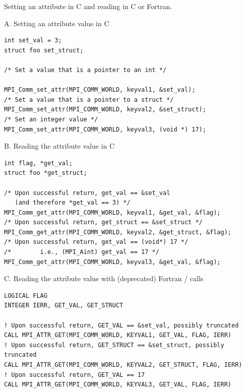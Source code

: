 \label{exa:misc-attr:c:pagebegin}%
\begin{example}
Setting an attribute in C and reading in C or Fortran.
%
%
\label{exa:misc-attr:c}%

A. Setting an attribute value in C
\begin{lstlisting}[language={[MPI]C}]
int set_val = 3;
struct foo set_struct;

/* Set a value that is a pointer to an int */

MPI_Comm_set_attr(MPI_COMM_WORLD, keyval1, &set_val);
/* Set a value that is a pointer to a struct */
MPI_Comm_set_attr(MPI_COMM_WORLD, keyval2, &set_struct);
/* Set an integer value */
MPI_Comm_set_attr(MPI_COMM_WORLD, keyval3, (void *) 17);
\end{lstlisting}

B. Reading the attribute value in C

\begin{lstlisting}[language={[MPI]C}]
int flag, *get_val;
struct foo *get_struct;

/* Upon successful return, get_val == &set_val
   (and therefore *get_val == 3) */
MPI_Comm_get_attr(MPI_COMM_WORLD, keyval1, &get_val, &flag);
/* Upon successful return, get_struct == &set_struct */
MPI_Comm_get_attr(MPI_COMM_WORLD, keyval2, &get_struct, &flag);
/* Upon successful return, get_val == (void*) 17 */
/*        i.e., (MPI_Aint) get_val == 17 */
MPI_Comm_get_attr(MPI_COMM_WORLD, keyval3, &get_val, &flag);
\end{lstlisting}

C. Reading the attribute value with (deprecated) Fortran \MPII/ calls

\begin{lstlisting}[language={[MPI]Fortran}]
LOGICAL FLAG
INTEGER IERR, GET_VAL, GET_STRUCT

! Upon successful return, GET_VAL == &set_val, possibly truncated
CALL MPI_ATTR_GET(MPI_COMM_WORLD, KEYVAL1, GET_VAL, FLAG, IERR)
! Upon successful return, GET_STRUCT == &set_struct, possibly truncated
CALL MPI_ATTR_GET(MPI_COMM_WORLD, KEYVAL2, GET_STRUCT, FLAG, IERR)
! Upon successful return, GET_VAL == 17
CALL MPI_ATTR_GET(MPI_COMM_WORLD, KEYVAL3, GET_VAL, FLAG, IERR)
\end{lstlisting}


\end{example}
